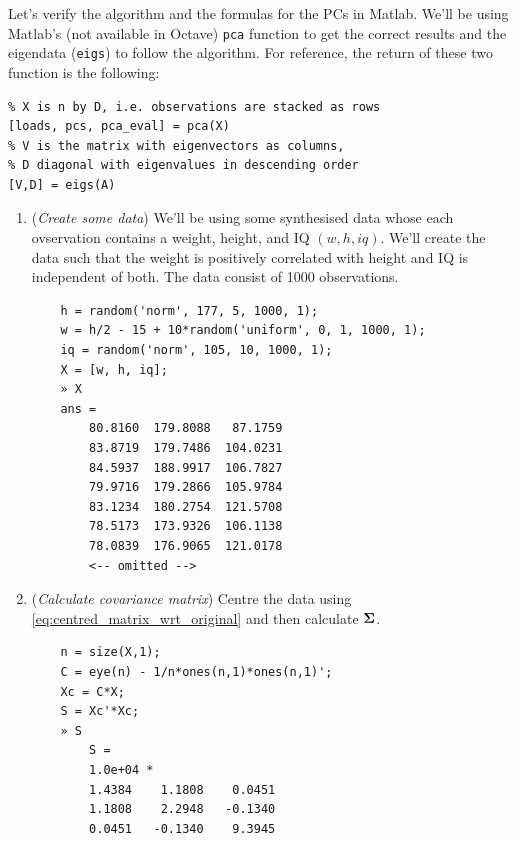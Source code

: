 \documentclass[a4paper]{article}
\begin{document}
Let's verify the algorithm and the formulas for the PCs in Matlab. We'll be using Matlab's (not available in Octave) \texttt{pca} function to get the correct results and the eigendata (\texttt{eigs}) to follow the algorithm. For reference, the return of these two function is the following:
\begin{verbatim}
% X is n by D, i.e. observations are stacked as rows
[loads, pcs, pca_eval] = pca(X)
% V is the matrix with eigenvectors as columns,
% D diagonal with eigenvalues in descending order 
[V,D] = eigs(A)
\end{verbatim}
\begin{enumerate}
    \item (\textit{Create some data}) We'll be using some synthesised data whose each ovservation contains a weight, height, and IQ $(w, h, iq)$. We'll create the data such that the weight is positively correlated with height and IQ is independent of both. The data consist of 1000 observations.
    \begin{verbatim}
    h = random('norm', 177, 5, 1000, 1);
    w = h/2 - 15 + 10*random('uniform', 0, 1, 1000, 1);
    iq = random('norm', 105, 10, 1000, 1);
    X = [w, h, iq];
    » X
    ans =
        80.8160  179.8088   87.1759
        83.8719  179.7486  104.0231
        84.5937  188.9917  106.7827
        79.9716  179.2866  105.9784
        83.1234  180.2754  121.5708
        78.5173  173.9326  106.1138
        78.0839  176.9065  121.0178
        <-- omitted -->
    \end{verbatim}
    \item (\textit{Calculate covariance matrix}) Centre the data using \eqref{eq:centred_matrix_wrt_original} and then calculate $\boldsymbol{\Sigma}$.
    \begin{verbatim}
    n = size(X,1);
    C = eye(n) - 1/n*ones(n,1)*ones(n,1)';
    Xc = C*X;
    S = Xc'*Xc;
    » S
        S =
        1.0e+04 *
        1.4384    1.1808    0.0451
        1.1808    2.2948   -0.1340
        0.0451   -0.1340    9.3945
    \end{verbatim}
    

\end{enumerate}
\end{document}
